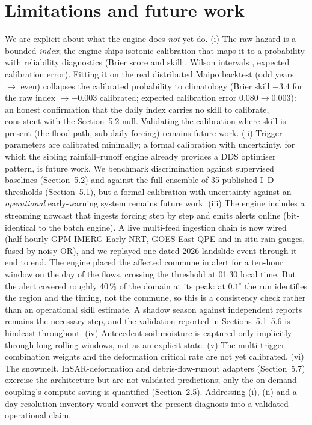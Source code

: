 \documentclass[authoryear,preprint,review,12pt]{elsarticle}
\begin{document}
\section{Limitations and future work}
\label{sec:limits}

We are explicit about what the engine does \emph{not} yet do. (i) The raw hazard
is a bounded \emph{index}; the engine ships isotonic calibration \citep{niculescumizil2005} that maps it to a
probability with reliability diagnostics (Brier score and skill \citep{brier1950}, Wilson intervals \citep{wilson1927},
expected calibration error). Fitting it on the real distributed Maipo backtest
(odd years $\to$ even) collapses the calibrated probability to climatology (Brier
skill $-3.4$ for the raw index $\to -0.003$ calibrated; expected calibration error
$0.080\to0.003$): an honest confirmation that the daily index carries no skill to
calibrate, consistent with the Section~5.2 null. Validating the calibration where
skill is present (the flood path, sub-daily forcing) remains future work.
(ii) Trigger parameters are calibrated
minimally; a formal calibration with uncertainty, for which the sibling
rainfall--runoff engine already provides a DDS \citep{tolson2007} optimiser pattern, is future work.
We benchmark discrimination against supervised baselines (Section~5.2) and against
the full ensemble of 35 published I--D thresholds (Section~5.1), but a formal
calibration with uncertainty against an \emph{operational} early-warning system
remains future work. (iii) The engine includes a streaming nowcast that ingests
forcing step by step and emits alerts online (bit-identical to the batch engine).
A live multi-feed ingestion chain is now wired (half-hourly GPM IMERG Early NRT,
GOES-East QPE and in-situ rain gauges, fused by noisy-OR), and we replayed one dated
2026 landslide event through it end to end. The engine placed the affected
commune in alert for a ten-hour window on the day of the flows, crossing the
threshold at 01:30 local time. But the alert covered roughly 40\,\% of the domain at
its peak: at $0.1^{\circ}$ the run identifies the region and the timing, not the
commune, so this is a consistency check rather than an operational skill
estimate. A shadow season against independent reports remains the necessary
step, and the validation reported in Sections~5.1--5.6 is hindcast throughout.
(iv) Antecedent soil moisture is captured only implicitly through long rolling
windows, not as an explicit state. (v) The multi-trigger combination weights and
the deformation critical rate are not yet calibrated. (vi) The snowmelt, InSAR-deformation
and debris-flow-runout adapters (Section~5.7) exercise the architecture but are not
validated predictions; only the on-demand coupling's compute saving is quantified
(Section~2.5).
Addressing (i), (ii) and a day-resolution inventory would convert the present
diagnosis into a validated operational claim.
\end{document}

